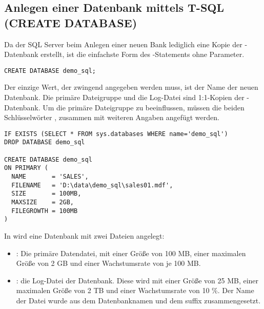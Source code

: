         \begin{literaturinternet}
          \item \cite{ms187997}
        \end{literaturinternet}
        \subsection{Anlegen einer Datenbank mittels T-SQL (CREATE DATABASE)}
        Da der SQL Server beim Anlegen einer neuen Bank lediglich eine Kopie
        der -Datenbank erstellt, ist die einfachste Form des
        -Statements ohne Parameter.
        \begin{lstlisting}[language=ms_sql,caption={Die
        einfachste Form von \languagemssql{CREATE DATABASE}},label=admin03_07]
CREATE DATABASE demo_sql;
        \end{lstlisting}
        Der einzige Wert, der zwingend angegeben werden muss, ist der Name der
        neuen Datenbank. Die primäre Dateigruppe und die Log-Datei sind
        1:1-Kopien der -Datenbank. Um die primäre
        Dateigruppe zu beeinflussen, müssen die beiden Schlüsselwörter
        , zusammen mit weiteren Angaben angefügt
        werden.
        \begin{lstlisting}[language=ms_sql,caption={Die
        Dateigruppe PRIMARY verändern},label=admin03_08]
IF EXISTS (SELECT * FROM sys.databases WHERE name='demo_sql')
DROP DATABASE demo_sql

CREATE DATABASE demo_sql
ON PRIMARY (
  NAME       = 'SALES',
  FILENAME   = 'D:\data\demo_sql\sales01.mdf',
  SIZE       = 100MB,
  MAXSIZE    = 2GB,
  FILEGROWTH = 100MB
)
        \end{lstlisting}
        In  wird eine Datenbank mit zwei Dateien
        angelegt:
        \begin{itemize}
            \item {}: Die primäre Datendatei, mit einer
            Größe von 100 MB, einer maximalen Größe von 2 GB und einer
            Wachstumsrate von je 100 MB.
            \item {}: die Log-Datei der Datenbank.
            Diese wird mit einer Größe von 25 MB, einer maximalen Größe von 2
            TB und einer Wachstumsrate von 10 \%. Der Name der Datei wurde aus
            dem Datenbanknamen und dem suffix 
            zusammengesetzt.
        \end{itemize}
